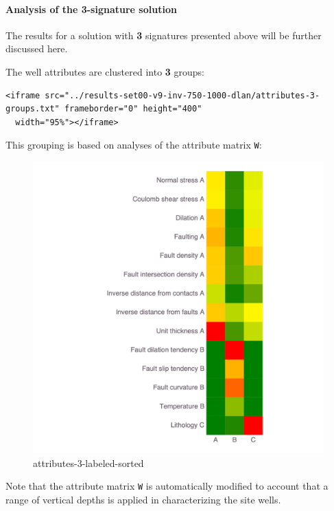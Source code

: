 \documentclass[11pt]{article}
\begin{document}
    \hypertarget{analysis-of-the-3-signature-solution}{%
\paragraph{Analysis of the 3-signature
solution}\label{analysis-of-the-3-signature-solution}}

The results for a solution with \textbf{3} signatures presented above
will be further discussed here.

The well attributes are clustered into \textbf{3} groups:

\begin{verbatim}
<iframe src="../results-set00-v9-inv-750-1000-dlan/attributes-3-groups.txt" frameborder="0" height="400"
  width="95%"></iframe>
\end{verbatim}

This grouping is based on analyses of the attribute matrix \texttt{W}:

\begin{figure}
\centering
\includegraphics{../figures-set00-v9-inv-750-1000-dlan/attributes-3-labeled-sorted.png}
\caption{attributes-3-labeled-sorted}
\end{figure}

Note that the attribute matrix \texttt{W} is automatically modified to
account that a range of vertical depths is applied in characterizing the
site wells.
\end{document}
